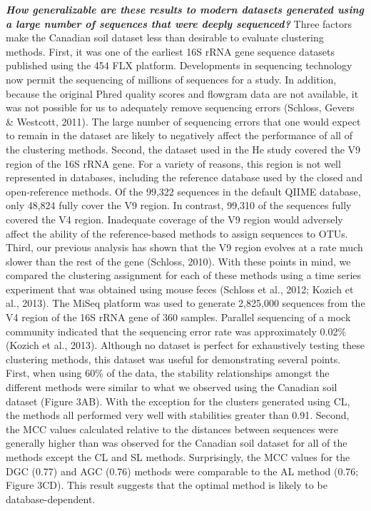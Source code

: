 \documentclass[11pt,]{article}
\begin{document}
\textbf{\emph{How generalizable are these results to modern datasets
generated using a large number of sequences that were deeply
sequenced?}} Three factors make the Canadian soil dataset less than
desirable to evaluate clustering methods. First, it was one of the
earliest 16S rRNA gene sequence datasets published using the 454 FLX
platform. Developments in sequencing technology now permit the
sequencing of millions of sequences for a study. In addition, because
the original Phred quality scores and flowgram data are not available,
it was not possible for us to adequately remove sequencing errors
(Schloss, Gevers \& Westcott, 2011). The large number of sequencing
errors that one would expect to remain in the dataset are likely to
negatively affect the performance of all of the clustering methods.
Second, the dataset used in the He study covered the V9 region of the
16S rRNA gene. For a variety of reasons, this region is not well
represented in databases, including the reference database used by the
closed and open-reference methods. Of the 99,322 sequences in the
default QIIME database, only 48,824 fully cover the V9 region. In
contrast, 99,310 of the sequences fully covered the V4 region.
Inadequate coverage of the V9 region would adversely affect the ability
of the reference-based methods to assign sequences to OTUs. Third, our
previous analysis has shown that the V9 region evolves at a rate much
slower than the rest of the gene (Schloss, 2010). With these points in
mind, we compared the clustering assignment for each of these methods
using a time series experiment that was obtained using mouse feces
(Schloss et al., 2012; Kozich et al., 2013). The MiSeq platform was used
to generate 2,825,000 sequences from the V4 region of the 16S rRNA gene
of 360 samples. Parallel sequencing of a mock community indicated that
the sequencing error rate was approximately 0.02\% (Kozich et al.,
2013). Although no dataset is perfect for exhaustively testing these
clustering methods, this dataset was useful for demonstrating several
points. First, when using 60\% of the data, the stability relationships
amongst the different methods were similar to what we observed using the
Canadian soil dataset (Figure 3AB). With the exception for the clusters
generated using CL, the methods all performed very well with stabilities
greater than 0.91. Second, the MCC values calculated relative to the
distances between sequences were generally higher than was observed for
the Canadian soil dataset for all of the methods except the CL and SL
methods. Surprisingly, the MCC values for the DGC (0.77) and AGC (0.76)
methods were comparable to the AL method (0.76; Figure 3CD). This result
suggests that the optimal method is likely to be database-dependent.
\end{document}
